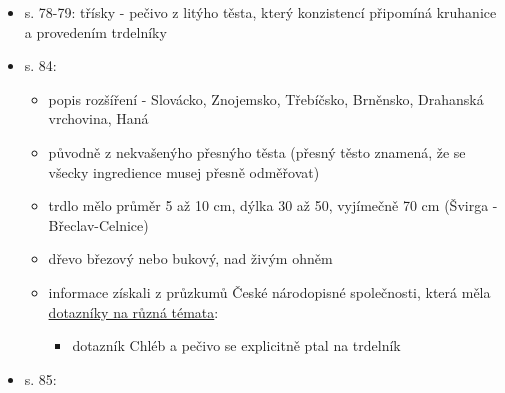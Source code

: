 \begin{itemize}
\begin{itemize}
    \begin{itemize}
    \tightlist
    \item
      nevíme, jak stará je tradice trdelníků, nejstarší recept je od
      Sibilly Dorizio, 1798, s 15 (Moje skrz čtyřicetileté vykonávání
      známá Kuchařská kniha pro velké i menší tabule) - ve skutečnosti
      asi vyšla pozdějc, kolem 1816 -
      \href{https://books.google.cz/books?vid=NKP:1002400169&printsec=frontcover\#v=onepage&q&f=false}{digitalizovaná
      verze}
    \item
      \href{https://books.google.cz/books?vid=NKP:1002400169&printsec=frontcover\#v=onepage&q=trdel&f=false}{recept
      na trdelník}
    \end{itemize}
  \item
    s. 78-79: třísky - pečivo z litýho těsta, který konzistencí
    připomíná kruhanice a provedením trdelníky
  \item
    s. 84:

    \begin{itemize}
    \tightlist
    \item
      popis rozšíření - Slovácko, Znojemsko, Třebíčsko, Brněnsko,
      Drahanská vrchovina, Haná
    \item
      původně z nekvašenýho přesnýho těsta (přesný těsto znamená, že se
      všecky ingredience musej přesně odměřovat)
    \item
      trdlo mělo průměr 5 až 10 cm, dýlka 30 až 50, vyjímečně 70 cm
      (Švirga - Břeclav-Celnice)
    \item
      dřevo březový nebo bukový, nad živým ohněm
    \item
      informace získali z průzkumů České národopisné společnosti, která
      měla
      \href{https://www.narodopisnaspolecnost.cz/index.php/virtualni-badatelna/itemlist/category/31-dotaznikydotazníky\%20na\%20různá\%20témata}{dotazníky
      na různá témata}:

      \begin{itemize}
      \tightlist
      \item
        dotazník Chléb a pečivo se explicitně ptal na trdelník
      \end{itemize}
    \end{itemize}
  \item
    s. 85:


\end{itemize}
\end{itemize}
